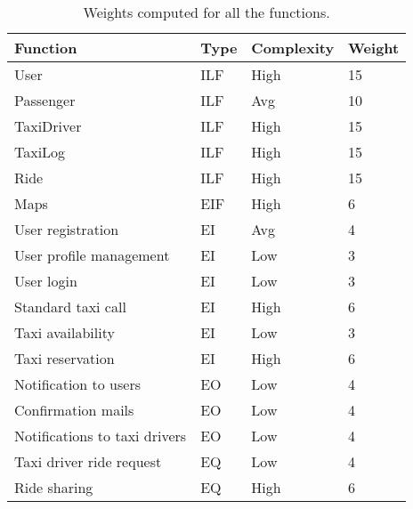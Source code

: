 \begin{table}
    \centering
    \begin{tabular}{| l | l | l | l |}
        \hline
        \textbf{Function} & \textbf{Type} & \textbf{Complexity}  & \textbf{Weight} \\
        \hline
        User       & ILF     & High     & 15     \\
        Passenger         & ILF     & Avg     & 10     \\
        TaxiDriver        & ILF     & High     & 15    \\
        TaxiLog     & ILF     & High    &    15 \\
        Ride & ILF     & High     & 15    \\
        Maps & EIF     & High     & 6    \\
        User registration & EI     & Avg     & 4    \\
        User profile management & EI     & Low     & 3    \\
        User login & EI     & Low     & 3    \\
        Standard taxi call & EI     & High     & 6    \\
        Taxi availability & EI     & Low     & 3    \\
        Taxi reservation & EI     & High     & 6    \\
        Notification to users & EO     & Low     & 4    \\
        Confirmation mails & EO     & Low     & 4    \\
        Notifications to taxi drivers & EO     & Low     & 4    \\
        Taxi driver ride request & EQ     & Low     & 4    \\
        Ride sharing & EQ     & High     & 6    \\
        \hline
    \end{tabular}
    \caption{Weights computed for all the functions.}
    \label{tab:computed-num-weights}
\end{table}

